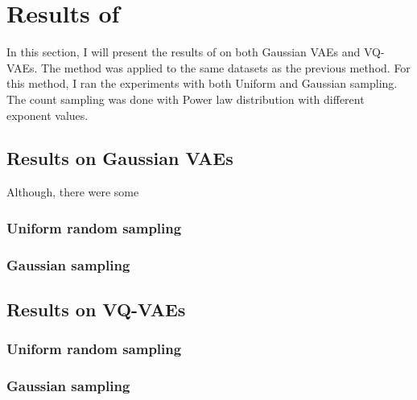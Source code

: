 \section{Results of }

In this section, I will present the results of  on both Gaussian VAEs and VQ-VAEs. The method was applied to the same datasets as the previous method. For this method, I ran the experiments with both Uniform and Gaussian sampling. The count sampling was done with Power law distribution with different exponent values.

\subsection{Results on Gaussian VAEs}

Although, there were some 



\subsubsection{Uniform random sampling}


\subsubsection{Gaussian sampling}

\subsection{Results on VQ-VAEs}

\subsubsection{Uniform random sampling}

\subsubsection{Gaussian sampling}


